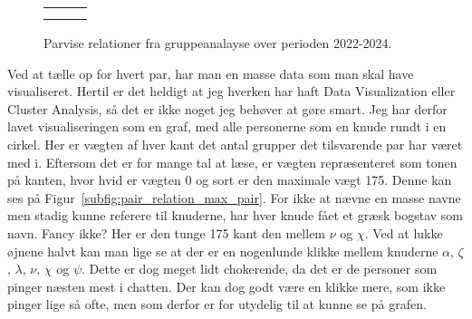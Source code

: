 \begin{article}
\begin{figure*}[t!]
	\centering
	\begin{tabularx}{2\columnwidth}{MMM}
		\resizebox{.64\columnwidth}{!}{}
		&
		\resizebox{.64\columnwidth}{!}{}
		&
		\resizebox{.64\columnwidth}{!}{}
		\\
		\label{subfig:pair_relation_max_pair}
		&
		\label{subfig:pair_relation_group_count}
		&
		\label{subfig:pair_relation_max_group_count}
	\end{tabularx}
	\vspace{-25pt}
	\caption{Parvise relationer fra gruppeanalayse over perioden 2022-2024.}
	\label{fig:pair_relation}
\end{figure*}

Ved at tælle op for hvert par, har man en masse data som man skal have visualiseret. Hertil er det heldigt at jeg hverken har haft Data Visualization eller Cluster Analysis, så det er ikke noget jeg behøver at gøre smart. Jeg har derfor lavet visualiseringen som en graf, med alle personerne som en knude rundt i en cirkel. Her er vægten af hver kant det antal grupper det tilsvarende par har været med i. Eftersom det er for mange tal at læse, er vægten repræsenteret som tonen på kanten, hvor hvid er vægten 0 og sort er den maximale vægt 175.
Denne kan ses på Figur~\ref{subfig:pair_relation_max_pair}. For ikke at nævne en masse navne men stadig kunne referere til knuderne, har hver knude fået et græsk bogstav som navn. Fancy ikke?
Her er den tunge 175 kant den mellem $\nu$ og $\chi$. Ved at lukke øjnene halvt kan man lige se at der er en nogenlunde klikke mellem knuderne $\alpha$, $\zeta$, $\lambda$, $\nu$, $\chi$ og $\psi$. Dette er dog meget lidt chokerende, da det er de personer som pinger næsten mest i chatten. Der kan dog godt være en klikke mere, som ikke pinger lige så ofte, men som derfor er for utydelig til at kunne se på grafen.


\end{article}
